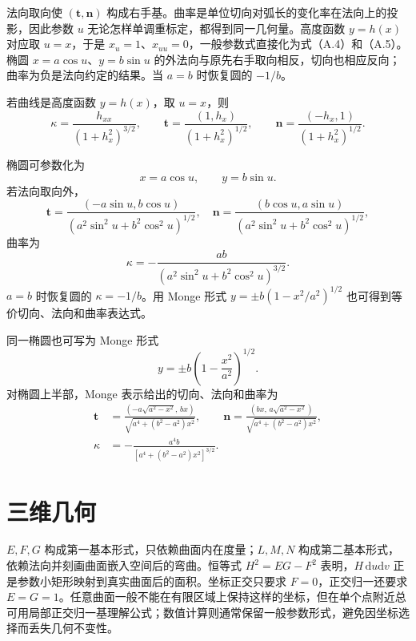 \documentclass[11pt,a4paper,openany,fontset=none]{ctexbook}
\begin{document}
法向取向使 $(\bm t,\bm n)$ 构成右手基。曲率是单位切向对弧长的变化率在法向上的投影，因此参数 $u$ 无论怎样单调重标定，都得到同一几何量。高度函数 $y=h(x)$ 对应取 $u=x$，于是 $x_u=1$、$x_{uu}=0$，一般参数式直接化为式（A.4）和（A.5）。椭圆 $x=a\cos u$、$y=b\sin u$ 的外法向与原先右手取向相反，切向也相应反向；曲率为负是法向约定的结果。当 $a=b$ 时恢复圆的 $-1/b$。

若曲线是高度函数 $y=h(x)$，取 $u=x$，则
\begin{equation}
 \kappa=\frac{h_{xx}}{(1+h_x^2)^{3/2}},\qquad
 \bm t=\frac{(1,h_x)}{(1+h_x^2)^{1/2}},\qquad
 \bm n=\frac{(-h_x,1)}{(1+h_x^2)^{1/2}}. \tag{A.4--A.5}
\end{equation}

椭圆可参数化为
\begin{equation}
 x=a\cos u,\qquad y=b\sin u. \tag{A.6}
\end{equation}
若法向取向外，
\begin{equation}
 \bm t=\frac{(-a\sin u,b\cos u)}{(a^2\sin^2u+b^2\cos^2u)^{1/2}},\quad
 \bm n=\frac{(b\cos u,a\sin u)}{(a^2\sin^2u+b^2\cos^2u)^{1/2}}, \tag{A.7}
\end{equation}
曲率为
\begin{equation}
 \kappa=-\frac{ab}{(a^2\sin^2u+b^2\cos^2u)^{3/2}}. \tag{A.8}
\end{equation}
$a=b$ 时恢复圆的 $\kappa=-1/b$。用 Monge 形式 $y=\pm b(1-x^2/a^2)^{1/2}$ 也可得到等价切向、法向和曲率表达式。

同一椭圆也可写为 Monge 形式
\begin{equation}
 y=\pm b\left(1-\frac{x^2}{a^2}\right)^{1/2}. \tag{A.9}
\end{equation}
对椭圆上半部，Monge 表示给出的切向、法向和曲率为
\begin{align}
 \bm t&=\frac{(-a\sqrt{a^2-x^2},\,bx)}{\sqrt{a^4+(b^2-a^2)x^2}},\qquad
 \bm n=\frac{(bx,\,a\sqrt{a^2-x^2})}{\sqrt{a^4+(b^2-a^2)x^2}}, \tag{A.10}\\
 \kappa&=-\frac{a^4b}{[a^4+(b^2-a^2)x^2]^{3/2}}. \tag{A.11}
\end{align}

\section{三维几何}
$E,F,G$ 构成第一基本形式，只依赖曲面内在度量；$L,M,N$ 构成第二基本形式，依赖法向并刻画曲面嵌入空间后的弯曲。恒等式 $H^2=EG-F^2$ 表明，$H\,\mathrm du\mathrm dv$ 正是参数小矩形映射到真实曲面后的面积。坐标正交只要求 $F=0$，正交归一还要求 $E=G=1$。任意曲面一般不能在有限区域上保持这样的坐标，但在单个点附近总可用局部正交归一基理解公式；数值计算则通常保留一般参数形式，避免因坐标选择而丢失几何不变性。
\end{document}
